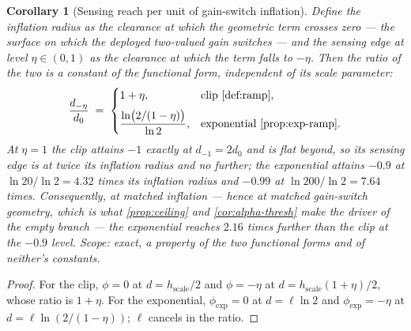 \documentclass[11pt]{article}
\theoremstyle{plain}
\newtheorem{corollary}[theorem]{Corollary}
\theoremstyle{definition}
\theoremstyle{remark}
\begin{document}
\begin{corollary}[Sensing reach per unit of gain-switch inflation]\label{cor:reach-per-inflation}
Define the \emph{inflation radius} as the clearance at which the geometric term crosses zero ---
the surface on which the deployed two-valued gain switches --- and the \emph{sensing edge} at
level $\eta\in(0,1)$ as the clearance at which the term falls to $-\eta$. Then the ratio of the
two is a constant of the functional form, independent of its scale parameter:
\begin{equation}
\frac{d_{-\eta}}{d_{0}}\;=\;
\begin{cases}
1+\eta, & \text{clip \cref{def:ramp}},\\[2mm]
\dfrac{\ln\!\big(2/(1-\eta)\big)}{\ln 2}, & \text{exponential \cref{prop:exp-ramp}}.
\end{cases}
\end{equation}
At $\eta=1$ the clip attains $-1$ exactly at $d_{-1}=2d_0$ and is flat beyond, so its sensing
edge is at twice its inflation radius and no further; the exponential attains $-0.9$ at
$\ln20/\ln2=4.32$ times its inflation radius and $-0.99$ at $\ln200/\ln2=7.64$ times.
Consequently, at matched inflation --- hence at matched gain-switch geometry, which is what
\cref{prop:ceiling} and \cref{cor:alpha-thresh} make the driver of the empty branch --- the
exponential reaches $2.16$ times further than the clip at the $-0.9$ level. Scope: exact,
a property of the two functional forms and of neither's constants.
\end{corollary}
\begin{proof}
For the clip, $\phi=0$ at $d=h_{\mathrm{scale}}/2$ and $\phi=-\eta$ at
$d=h_{\mathrm{scale}}(1+\eta)/2$, whose ratio is $1+\eta$. For the exponential,
$\phi_{\exp}=0$ at $d=\ell\ln2$ and $\phi_{\exp}=-\eta$ at $d=\ell\ln(2/(1-\eta))$; $\ell$
cancels in the ratio.
\end{proof}
\end{document}
